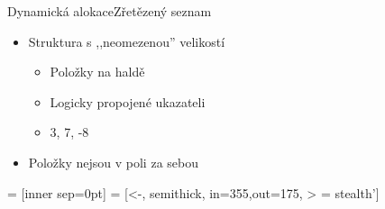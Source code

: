 \begin{frame}{Dynamická alokace}{Zřetězený seznam}

  \begin{itemize}
    \item Struktura s ,,neomezenou'' velikostí
    \begin{itemize}
      \item Položky na haldě
      \item Logicky propojené ukazateli
      \item 3, 7, -8
    \end{itemize}

    \pause

    \item Položky nejsou v poli za sebou
  \end{itemize}

  \bigskip

  \begin{center}
     = [inner sep=0pt]
     = [<-, semithick, in=355,out=175, > = stealth']
  \end{center}

\end{frame}

